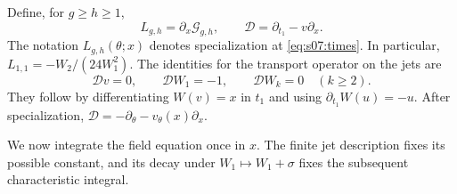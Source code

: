 \documentclass[a4paper,10pt]{article}
\numberwithin{equation}{section}
\theoremstyle{paperplain}
\theoremstyle{paperremark}
\theoremstyle{paperplain}
\begin{document}
Define, for $g\geq h\geq1$,
\begin{equation}\label{eq:s07:transport-definitions}
 L_{g,h}=\partial_x\mathcal G_{g,h},\qquad
 \mathscr D=\partial_{t_1}-v\partial_x.
\end{equation}
The notation $L_{g,h}(\theta;x)$ denotes specialization at
\eqref{eq:s07:times}. In particular,
$L_{1,1}=-W_2/(24W_1^2)$.
The identities for the transport operator on the jets are
\begin{equation}\label{eq:s07:jet-transport}
 \mathscr Dv=0,\qquad
 \mathscr DW_1=-1,\qquad \mathscr DW_k=0\quad(k\geq2).
\end{equation}
They follow by differentiating $W(v)=x$ in $t_1$ and using
$\partial_{t_1}W(u)=-u$. After specialization,
$\mathscr D=-\partial_\theta-v_\theta(x)\partial_x$.

We now integrate the field equation once in $x$. The finite jet
description fixes its possible constant, and its decay under
$W_1\mapsto W_1+\sigma$ fixes the subsequent characteristic integral.
\end{document}
